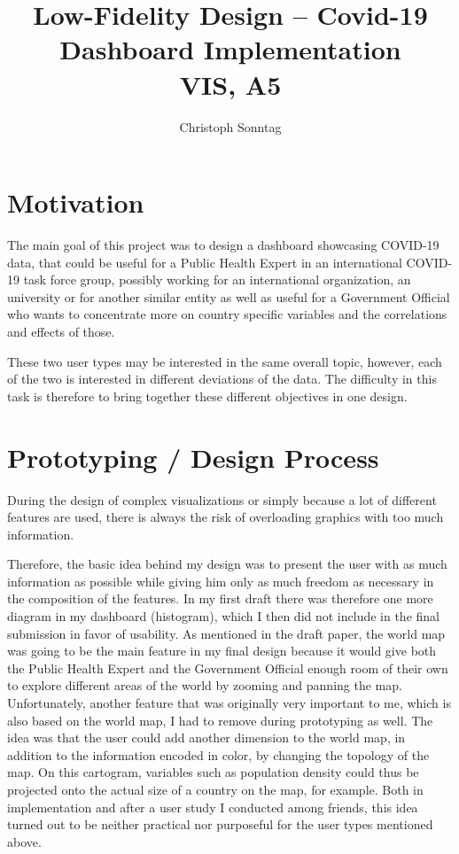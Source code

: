 \documentclass[11pt]{article}
\title{Low-Fidelity Design -- Covid-19 Dashboard Implementation\\ \small{VIS, A5}}
\author{Christoph Sonntag}
\begin{document}
\maketitle
{}


\section{Motivation}
The main goal of this project was to design a dashboard showcasing COVID-19 data, that could be useful for a
Public Health Expert in an international COVID-19 task force group, possibly working for an international organization,
an university or for another similar entity as well as useful for a
Government Official who wants to concentrate more on country specific variables and the correlations and effects of those.

These two user types may be interested in the same overall topic, however, each of the two is interested in
different deviations of the data.
The difficulty in this task is therefore to bring together these different objectives
in one design.


\section{Prototyping / Design Process}
During the design of complex visualizations or simply because a lot of different features are used, there is always
the risk of overloading graphics with too much information.

Therefore, the basic idea behind my design was to present the user with as much information as possible while giving him only as much freedom as necessary in the composition of the features.
In my first draft there was therefore one more diagram in my dashboard (histogram), which I then did not include in the final submission in favor of usability.
As mentioned in the draft paper, the world map was going to be the main feature in my final design because it would give both the Public Health Expert and the Government Official enough room of their own to explore different areas of the world by zooming and panning the map.
Unfortunately, another feature that was originally very important to me, which is also based on the world map, I had to remove during prototyping as well.
The idea was that the user could add another dimension to the world map, in addition to the information encoded in color, by changing the topology of the map. On this cartogram, variables such as population density could thus be projected onto the actual size of a country on the map, for example.
Both in implementation and after a user study I conducted among friends, this idea turned out to be neither practical nor purposeful for the user types mentioned above.
\end{document}

